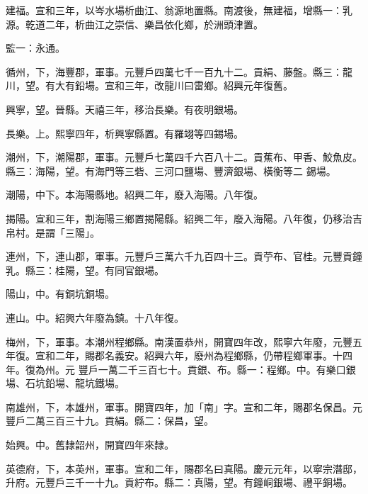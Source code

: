 \begin{pinyinscope}
 建福。宣和三年，以岑水場析曲江、翁源地置縣。南渡後，無建福，增縣一：乳源。乾道二年，析曲江之崇信、樂昌依化鄉，於洲頭津置。



 監一：永通。



 循州，下，海豐郡，軍事。元豐戶四萬七千一百九十二。貢絹、藤盤。縣三：龍川，望。有大有鉛場。宣和三年，改龍川曰雷鄉。紹興元年復舊。



 興寧，望。晉縣。天禧三年，移治長樂。有夜明銀場。



 長樂。上。熙寧四年，析興寧縣置。有羅翊等四錫場。



 潮州，下，潮陽郡，軍事。元豐戶七萬四千六百八十二。貢蕉布、甲香、鮫魚皮。縣三：海陽，望。有海門等三砦、三河口鹽場、豐濟銀場、橫衡等二
 錫場。



 潮陽，中下。本海陽縣地。紹興二年，廢入海陽。八年復。



 揭陽。宣和三年，割海陽三鄉置揭陽縣。紹興二年，廢入海陽。八年復，仍移治吉帛村。是謂「三陽」。



 連州，下，連山郡，軍事。元豐戶三萬六千九百四十三。貢苧布、官桂。元豐貢鐘乳。縣三：桂陽，望。有同官銀場。



 陽山，中。有銅坑銅場。



 連山。中。紹興六年廢為鎮。十八年復。



 梅州，下，軍事。本潮州程鄉縣。南漢置恭州，開寶四年改，熙寧六年廢，元豐五年復。宣和二年，賜郡名義安。紹興六年，廢州為程鄉縣，仍帶程鄉軍事。十四年。復為州。元
 豐戶一萬二千三百七十。貢銀、布。縣一：程鄉。中。有樂口銀場、石坑鉛場、龍坑鐵場。



 南雄州，下，本雄州，軍事。開寶四年，加「南」字。宣和二年，賜郡名保昌。元豐戶二萬三百三十九。貢絹。縣二：保昌，望。



 始興。中。舊隸韶州，開寶四年來隸。



 英德府，下，本英州，軍事。宣和二年，賜郡名曰真陽。慶元元年，以寧宗潛邸，升府。元豐戶三千一十九。貢紵布。縣二：真陽，望。有鐘峒銀場、禮平銅場。




\end{pinyinscope}
